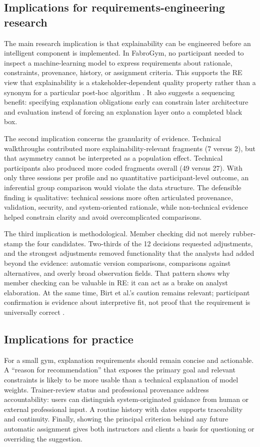 \documentclass[pdflatex,sn-basic]{sn-jnl}
\begin{document}
\subsection{Implications for requirements-engineering research}
The main research implication is that explainability can be engineered before an intelligent component is implemented. In FabroGym, no participant needed to inspect a machine-learning model to express requirements about rationale, constraints, provenance, history, or assignment criteria. This supports the RE view that explainability is a stakeholder-dependent quality property rather than a synonym for a particular post-hoc algorithm \cite{chazette2020,chazette2021,chazette2022}. It also suggests a sequencing benefit: specifying explanation obligations early can constrain later architecture and evaluation instead of forcing an explanation layer onto a completed black box.

The second implication concerns the granularity of evidence. Technical walkthroughs contributed more explainability-relevant fragments (7 versus 2), but that asymmetry cannot be interpreted as a population effect. Technical participants also produced more coded fragments overall (49 versus 27). With only three sessions per profile and no quantitative participant-level outcome, an inferential group comparison would violate the data structure. The defensible finding is qualitative: technical sessions more often articulated provenance, validation, security, and system-oriented rationale, while non-technical evidence helped constrain clarity and avoid overcomplicated comparisons.

The third implication is methodological. Member checking did not merely rubber-stamp the four candidates. Two-thirds of the 12 decisions requested adjustments, and the strongest adjustments removed functionality that the analysts had added beyond the evidence: automatic version comparisons, comparisons against alternatives, and overly broad observation fields. That pattern shows why member checking can be valuable in RE: it can act as a brake on analyst elaboration. At the same time, Birt et al.'s caution remains relevant; participant confirmation is evidence about interpretive fit, not proof that the requirement is universally correct \cite{birt2016}.

\subsection{Implications for practice}
For a small gym, explanation requirements should remain concise and actionable. A ``reason for recommendation'' that exposes the primary goal and relevant constraints is likely to be more usable than a technical explanation of model weights. Trainer-review status and professional provenance address accountability: users can distinguish system-originated guidance from human or external professional input. A routine history with dates supports traceability and continuity. Finally, showing the principal criterion behind any future automatic assignment gives both instructors and clients a basis for questioning or overriding the suggestion.
\end{document}
